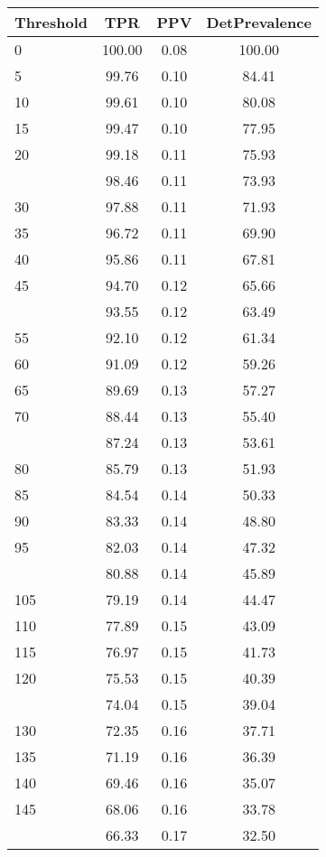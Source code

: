 \begin{table}[ht]
\centering
\begin{tabular}{lccc}
  \toprule
Threshold & TPR & PPV & DetPrevalence \\ 
  \midrule
0 & 100.00 & 0.08 & 100.00 \\ 
  5 & 99.76 & 0.10 & 84.41 \\ 
  10 & 99.61 & 0.10 & 80.08 \\ 
  15 & 99.47 & 0.10 & 77.95 \\ 
  20 & 99.18 & 0.11 & 75.93 \\ 
   \addlinespace
25 & 98.46 & 0.11 & 73.93 \\ 
  30 & 97.88 & 0.11 & 71.93 \\ 
  35 & 96.72 & 0.11 & 69.90 \\ 
  40 & 95.86 & 0.11 & 67.81 \\ 
  45 & 94.70 & 0.12 & 65.66 \\ 
   \addlinespace
50 & 93.55 & 0.12 & 63.49 \\ 
  55 & 92.10 & 0.12 & 61.34 \\ 
  60 & 91.09 & 0.12 & 59.26 \\ 
  65 & 89.69 & 0.13 & 57.27 \\ 
  70 & 88.44 & 0.13 & 55.40 \\ 
   \addlinespace
75 & 87.24 & 0.13 & 53.61 \\ 
  80 & 85.79 & 0.13 & 51.93 \\ 
  85 & 84.54 & 0.14 & 50.33 \\ 
  90 & 83.33 & 0.14 & 48.80 \\ 
  95 & 82.03 & 0.14 & 47.32 \\ 
   \addlinespace
100 & 80.88 & 0.14 & 45.89 \\ 
  105 & 79.19 & 0.14 & 44.47 \\ 
  110 & 77.89 & 0.15 & 43.09 \\ 
  115 & 76.97 & 0.15 & 41.73 \\ 
  120 & 75.53 & 0.15 & 40.39 \\ 
   \addlinespace
125 & 74.04 & 0.15 & 39.04 \\ 
  130 & 72.35 & 0.16 & 37.71 \\ 
  135 & 71.19 & 0.16 & 36.39 \\ 
  140 & 69.46 & 0.16 & 35.07 \\ 
  145 & 68.06 & 0.16 & 33.78 \\ 
   \addlinespace
150 & 66.33 & 0.17 & 32.50 \\ 

\end{tabular}
\end{table}

